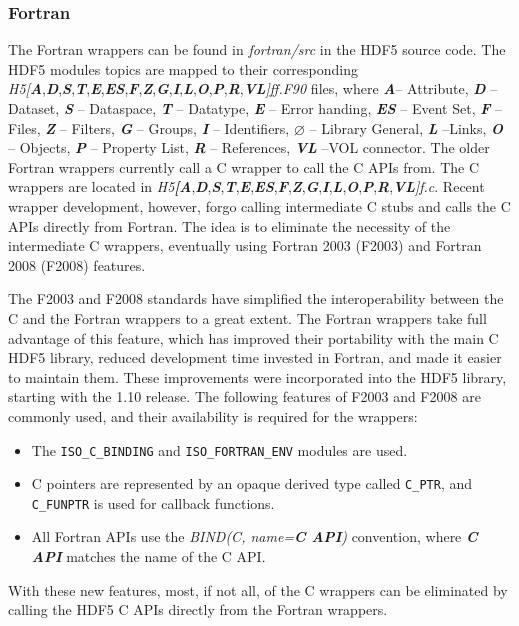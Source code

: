 \subsubsection{Fortran\label{subsec:Fortran}}

The Fortran wrappers can be found in \textit{fortran/src} in the HDF5 source code. The HDF5 modules topics are mapped to their corresponding
\emph{H5{[}}\textbf{\textsl{A}},\textbf{\textsl{D}},\textbf{\textsl{S}},\textbf{\textsl{T}},\textbf{\textsl{E}},\textbf{\textsl{ES}},\textbf{\textsl{F}},\textbf{\textsl{Z}},\textbf{\textsl{G}},\textbf{\textsl{I}},\textbf{\textsl{L}},\textbf{\textsl{O}},\textbf{\textsl{P}},\textbf{\textsl{R}},\textbf{\textsl{VL}}\emph{{]}ff.F90} files, where \textbf{\textsl{A}}-- Attribute, \textbf{\textsl{D}} -- Dataset, \textbf{\textsl{S}} -- Dataspace, \textbf{\textsl{T}}
-- Datatype, \textbf{\textsl{E}} -- Error handing, \textbf{\textsl{ES}} -- Event Set, \textbf{\textsl{F}} -- Files, \textbf{\textsl{Z}} -- Filters, \textbf{\textsl{G}} -- Groups, \textbf{\textsl{I}} -- Identifiers,  $\varnothing$ -- Library General, \textbf{\textsl{L}} --Links, \textbf{\textsl{O}} -- Objects, \textbf{\textsl{P}} -- Property
List, \textbf{\textsl{R}} -- References, \textbf{\textsl{VL}} --VOL connector. The older Fortran wrappers currently call a C wrapper
to call the C APIs from. The C wrappers are located in \emph{H5}\textbf{\textsl{{[}A}},\textbf{\textsl{D}},\textbf{\textsl{S}},\textbf{\textsl{T}},\textbf{\textsl{E}},\textbf{\textsl{ES}},\textbf{\textsl{F}},\textbf{\textsl{Z}},\textbf{\textsl{G}},\textbf{\textsl{I}},\textbf{\textsl{L}},\textbf{\textsl{O}},\textbf{\textsl{P}},\textbf{\textsl{R}},\textbf{\textsl{VL}}\emph{{]}f.c}.
Recent wrapper development, however, forgo calling intermediate C stubs and calls the C APIs directly from Fortran. The idea is to eliminate the necessity of the intermediate C wrappers, eventually using Fortran 2003 (F2003) and Fortran 2008 (F2008) features.

The F2003 and F2008 standards have simplified the interoperability between the C and the Fortran wrappers to a great extent. The Fortran wrappers take full advantage of this feature, which has improved their portability with the main C HDF5 library, reduced development time invested in Fortran, and made it easier to maintain them. These improvements were incorporated into the HDF5 library, starting with the 1.10 release.
The following features of F2003 and F2008 are commonly used, and their availability is required for the wrappers:
\begin{itemize}
    \item The \texttt{ISO\_C\_BINDING} and \texttt{ISO\_FORTRAN\_ENV} modules are used.
    \item C pointers are represented by an opaque derived type called \texttt{C\_PTR}, and \texttt{C\_FUNPTR} is used for callback functions.
    \item All Fortran APIs use the \textit{BIND(C, name=\textbf{C API})} convention, where \textit{\textbf{C API}} matches the name of the C API.
\end{itemize}
With these new features, most, if not all, of the C wrappers can be eliminated by calling the HDF5 C APIs directly from the Fortran wrappers. 

